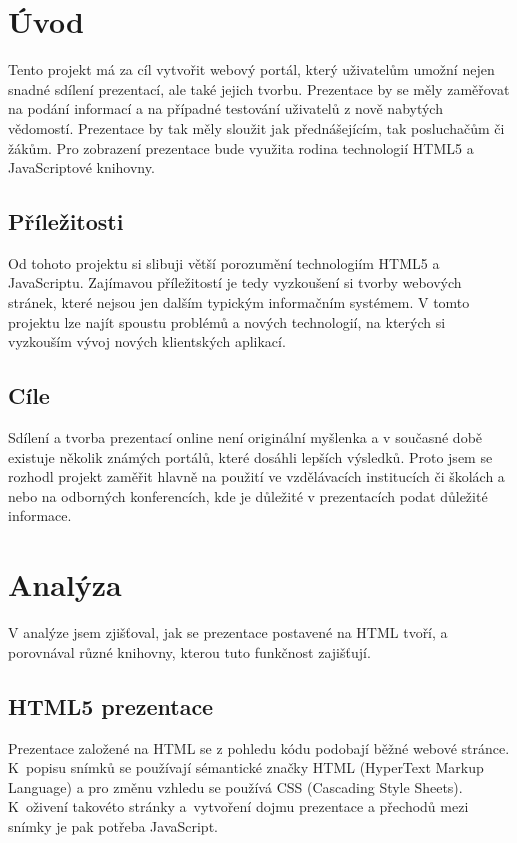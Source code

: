 \documentclass[11pt,twoside,a4paper]{book}
\begin{document}
	\listoffigures			%

	\mainbodystarts



\chapter{Úvod}
Tento projekt má za cíl vytvořit webový portál, který uživatelům umožní nejen snadné sdílení prezentací, ale také jejich tvorbu. Prezentace by se měly zaměřovat na podání informací a na případné testování uživatelů z nově nabytých vědomostí. Prezentace by tak měly sloužit jak přednášejícím, tak posluchačům či žákům. Pro zobrazení prezentace bude využita rodina technologií HTML5 a JavaScriptové knihovny.

\section{Příležitosti}
Od tohoto projektu si slibuji větší porozumění technologiím HTML5 a JavaScriptu. Zajímavou příležitostí je tedy vyzkoušení si tvorby webových stránek, které nejsou jen dalším typickým informačním systémem. V tomto projektu lze najít spoustu problémů a nových technologií, na kterých si vyzkouším vývoj nových klientských aplikací.

\section{Cíle}
Sdílení a tvorba prezentací online není originální myšlenka a v současné době existuje několik známých portálů, které dosáhli lepších výsledků. Proto jsem se rozhodl projekt zaměřit hlavně na použití ve vzdělávacích institucích či školách a nebo na odborných konferencích, kde je důležité v prezentacích podat důležité informace.



\chapter{Analýza}
V analýze jsem zjišťoval, jak se prezentace postavené na HTML tvoří, a porovnával různé knihovny, kterou tuto funkčnost zajišťují.


\section{HTML5 prezentace}
Prezentace založené na HTML se z pohledu kódu podobají běžné webové stránce. K~popisu snímků se používají sémantické značky HTML (HyperText Markup Language) a pro změnu vzhledu se používá CSS (Cascading Style Sheets). K~oživení takovéto stránky a~vytvoření dojmu prezentace a přechodů mezi snímky je pak potřeba JavaScript.
\end{document}

